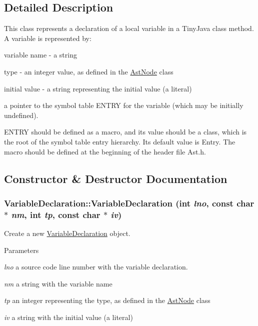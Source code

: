 \subsection{Detailed Description}
This class represents a declaration of a local variable in a TinyJava class method. A variable is represented by:
\begin{DoxyItemize}
\item variable name -\/ a string
\item type -\/ an integer value, as defined in the \hyperlink{classAstNode}{AstNode} class
\item initial value -\/ a string representing the initial value (a literal)
\item a pointer to the symbol table ENTRY for the variable (which may be initially undefined).
\end{DoxyItemize}

ENTRY should be defined as a macro, and its value should be a class, which is the root of the symbol table entry hierarchy. Its default value is Entry. The macro should be defined at the beginning of the header file Ast.h. 

\subsection{Constructor \& Destructor Documentation}
\hypertarget{classVariableDeclaration_a4d671e248b007508b41e69a6c0571957}{
\subsubsection[{VariableDeclaration}]{\setlength{\rightskip}{0pt plus 5cm}VariableDeclaration::VariableDeclaration (int {\em lno}, \/  const char $\ast$ {\em nm}, \/  int {\em tp}, \/  const char $\ast$ {\em iv})}}
\label{classVariableDeclaration_a4d671e248b007508b41e69a6c0571957}
Create a new \hyperlink{classVariableDeclaration}{VariableDeclaration} object.


\begin{DoxyParams}{Parameters}
\item[{\em lno}]a source code line number with the variable declaration. \item[{\em nm}]a string with the variable name \item[{\em tp}]an integer representing the type, as defined in the \hyperlink{classAstNode}{AstNode} class \item[{\em iv}]a string with the initial value (a literal) \end{DoxyParams}

